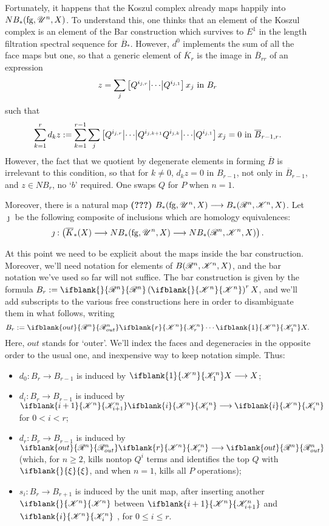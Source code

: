 \documentclass[11pt]{article}
\newcommand{\PRLie}[1]{\scrR^{#1}}%
\newcommand{\LL}[1]{{\scrK}^{#1}}%
\newcommand{\nontop}[1]{\scrU^{#1}}%
\newcommand{\forget}{\mathrm{fg}}
\newcommand{\Fr}[2][]{\ifblank{#1}{#2}{#2_{#1}}}
\newcommand{\restn}[2][]{\ifblank{#1}{\xi{#2}}{\xi_{#1}{#2}}}%
\renewcommand{\Q}{Q}
\begin{document}
\begin{LieLambdaStructureOnKoszul}
Fortunately, it happens that the Koszul complex already maps happily into $N{B_*}(\forget,\nontop{n},X)$. To understand this, one thinks that an element of the Koszul complex is an element of the Bar construction which survives to $E^1$ in the length filtration spectral sequence for $\overline{B}_*$. However, $d^0$ implements the sum of all the face maps but one, so that a generic element of $\overline{K}_r$ is the image in $\overline{B}_{rr}$ of an expression
\[z=\sum_{j}\left[\Q^{i_{j,r}} \middle|\cdots\middle|\Q^{i_{j,1}} \right]x_j\textup{ in }B_{r}\]
such that 
\[\sum_{k=1}^{r}d_kz:=\sum_{k=1}^{r-1}\sum_{j}\left[\Q^{i_{j,r}} \middle|\cdots\middle|\Q^{i_{j,k+1}}\Q^{i_{j,k}}\middle|\cdots\middle|\Q^{i_{j,1}} \right]x_j=0\textup{ in }\overline{B}_{r-1,r}.\]
However, the fact that we quotient by degenerate elements in forming $\overline{B}$ is irrelevant to this condition, so that for $k\neq 0$, $d_kz=0$ in $B_{r-1}$, not only in $\overline{B}_{r-1}$, and $z\in NB_r$, no `$b$' required. One swaps $\Q$ for $P$ when $n=1$.

Moreover, there is a natural map \textbf{(???)} ${B_*}(\forget,\nontop{n},X)\to {B_*}(\PRLie{n},\LL{n},X)$. Let $\jmath$ be the following composite of inclusions which are homology equivalences:
\[\jmath:\left(\overline{K}_*(X)\to  NB_*(\forget,\nontop{n},X)\to N{B_*}(\PRLie{n},\LL{n},X)\right).\]

At this point we need to be explicit about the maps inside the bar construction. Moreover, we'll need notation for elements of $B(\PRLie{n},\LL{n},X)$, and the bar notation we've used so far will not suffice. The bar construction is given by the formula $B_r:=\Fr{\PRLie{n}}\left(\Fr{\LL{n}}\right)^rX$, and we'll add subscripts to the various free constructions here in order to disambiguate them in what follows, writing
\[B_r:=\Fr[out]{\PRLie{n}}\Fr[r]{\LL{n}}\cdots\Fr[1]{\LL{n}} X.\]
Here, $out$ stands for `outer'. We'll index the faces and degeneracies in the opposite order to the usual one, and inexpensive way to keep notation simple. Thus:
\begin{itemize}\squishlist
\setlength{\parindent}{.25in}
\item $d_0:B_r\to B_{r-1}$ is induced by $\Fr[1]{\LL{n}}X\to X$;
\item $d_i:B_r\to B_{r-1}$ is induced by $\Fr[i+1]{\LL{n}}\Fr[i]{\LL{n}}\to \Fr[i]{\LL{n}}$ for $0<i<r$;
\item $d_r:B_r\to B_{r-1}$ is induced by $\Fr[out]{\PRLie{n}}\Fr[r]{\LL{n}}\to \Fr[out]{\PRLie{n}}$ (which, for $n\geq2$, kills nontop $\Q^i$ terms and identifies the top $\Q$ with $\restn{}$, and when $n=1$, kills all $P$ operations);
\item $s_i:B_r\to B_{r+1}$ is induced by the unit map, after inserting another $\Fr{\LL{n}}$ between $\Fr[i+1]{\LL{n}}$ and $\Fr[i]{\LL{n}}$ , for $0\leq i\leq r$.
\end{itemize}



\end{LieLambdaStructureOnKoszul}
\end{document}

